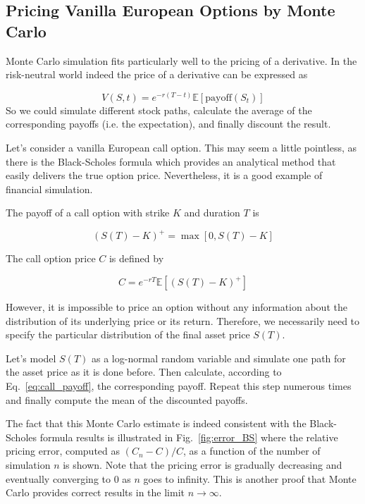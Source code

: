 \subsection{Pricing Vanilla European Options by Monte Carlo}
Monte Carlo simulation fits particularly well to the pricing of a derivative. In the risk-neutral world indeed the price of a derivative can be expressed as

\begin{equation}
V(S, t) = e^{-r(T-t)} \mathbb{E}[\textrm{payoff}(S_t)]
\end{equation}
So we could simulate different stock paths, calculate the average of the corresponding payoffs (i.e. the expectation), and finally discount the result.

Let's consider a vanilla European call option. This may seem a little pointless, as there is the Black-Scholes formula which provides an analytical method that easily delivers the true option price. Nevertheless, it is a good example of financial simulation. 

The payoff of a call option with strike $K$ and duration $T$ is 

\begin{equation}
(S(T)−K)^+ = \max[0,S(T)−K]
\end{equation}

The call option price $C$ is defined by

\begin{equation} 
C = e^{−rT} \mathbb{E}[(S(T) −K)^+ ]
\label{eq:call_payoff}
\end{equation}

However, it is impossible to price an option without any information about the distribution of its underlying price or its return. Therefore, we necessarily need to specify the particular distribution of the final asset price $S(T)$. 

Let's model $S(T)$ as a log-normal random variable and simulate one path for the asset price as it is done before. Then calculate, according to Eq.~\ref{eq:call_payoff}, the corresponding payoff. Repeat this step numerous times and finally compute the mean of the discounted payoffs. 

The fact that this Monte Carlo estimate is indeed consistent with the Black-Scholes formula results is illustrated in Fig.~\ref{fig:error_BS} where the relative pricing error, computed as $(C_n − C)/C$, as a function of the number of simulation $n$ is shown. Note that the pricing error is gradually decreasing and eventually converging to 0 as $n$ goes to infinity. This is another proof that Monte Carlo provides correct results in the limit $n\rightarrow\infty$.

